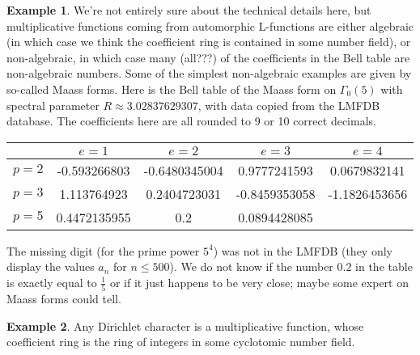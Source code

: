 \documentclass[a4paper]{article}
\theoremstyle{definition}
\newtheorem{example}{Example}[section]
\theoremstyle{remark}
\begin{document}
\begin{example}
We're not entirely sure about the technical details here, but multiplicative functions coming from automorphic L-functions are either algebraic (in which case we think the coefficient ring is contained in some number field), or non-algebraic, in which case many (all???) of the coefficients in the Bell table are non-algebraic numbers. Some of the simplest non-algebraic examples are given by so-called Maass forms. Here is the Bell table of the Maass form on $\Gamma_0(5)$ with spectral parameter $R \approx 3.02837629307$, with data copied from the LMFDB database. The coefficients here are all rounded to 9 or 10 correct decimals. 
\vskip10pt
\begin{center}
\begin{tabular}{| l | | c | c | c | c |}
\hline
& $e = 1$ & $e = 2$ & $e = 3$ & $e = 4$ \\
\hline
\hline
$p = 2$ & -0.593266803 & -0.6480345004 & 0.9777241593 & 0.0679832141 \\
\hline
$p = 3$ & 1.113764923 & 0.2404723031 & -0.8459353058 & -1.1826453656 \\
\hline
$p = 5$ & 0.4472135955 & 0.2 & 0.0894428085 &  \\
\hline
\end{tabular}
\end{center}
The missing digit (for the prime power $5^4$) was not in the LMFDB (they only display the values $a_n$ for $n \leq 500$). We do not know if the number $0.2$ in the table is exactly equal to $\frac{1}{5}$ or if it just happens to be very close; maybe some expert on Maass forms could tell.
\end{example}

\begin{example}
Any Dirichlet character is a multiplicative function, whose coefficient ring is the ring of integers in some cyclotomic number field.
\end{example}
\end{document}
